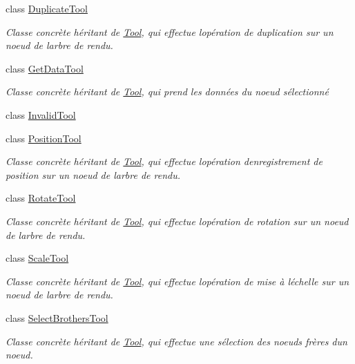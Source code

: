 \begin{DoxyCompactItemize}
class \hyperlink{class_duplicate_tool}{Duplicate\+Tool}
\begin{DoxyCompactList}\small\item\em Classe concrète héritant de \hyperlink{class_tool}{Tool}, qui effectue l\textquotesingle{}opération de duplication sur un noeud de l\textquotesingle{}arbre de rendu. \end{DoxyCompactList}\item 
class \hyperlink{class_get_data_tool}{Get\+Data\+Tool}
\begin{DoxyCompactList}\small\item\em Classe concrète héritant de \hyperlink{class_tool}{Tool}, qui prend les données du noeud sélectionné \end{DoxyCompactList}\item 
class \hyperlink{class_invalid_tool}{Invalid\+Tool}
\item 
class \hyperlink{class_position_tool}{Position\+Tool}
\begin{DoxyCompactList}\small\item\em Classe concrète héritant de \hyperlink{class_tool}{Tool}, qui effectue l\textquotesingle{}opération d\textquotesingle{}enregistrement de position sur un noeud de l\textquotesingle{}arbre de rendu. \end{DoxyCompactList}\item 
class \hyperlink{class_rotate_tool}{Rotate\+Tool}
\begin{DoxyCompactList}\small\item\em Classe concrète héritant de \hyperlink{class_tool}{Tool}, qui effectue l\textquotesingle{}opération de rotation sur un noeud de l\textquotesingle{}arbre de rendu. \end{DoxyCompactList}\item 
class \hyperlink{class_scale_tool}{Scale\+Tool}
\begin{DoxyCompactList}\small\item\em Classe concrète héritant de \hyperlink{class_tool}{Tool}, qui effectue l\textquotesingle{}opération de mise à l\textquotesingle{}échelle sur un noeud de l\textquotesingle{}arbre de rendu. \end{DoxyCompactList}\item 
class \hyperlink{class_select_brothers_tool}{Select\+Brothers\+Tool}
\begin{DoxyCompactList}\small\item\em Classe concrète héritant de \hyperlink{class_tool}{Tool}, qui effectue une sélection des noeuds frères d\textquotesingle{}un noeud. \end{DoxyCompactList}\item 

\end{DoxyCompactItemize}
